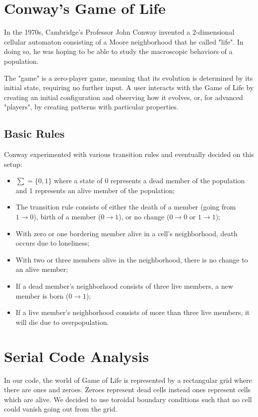 \documentclass[a4paper,11pt,twoside]{report}
\begin{document}
\chapter{Conway's Game of Life}\label{Conway}

In the 1970s, Cambridge's Professor John Conway invented a 2-dimensional cellular automaton consisting of a Moore neighborhood that he called "life". In doing so, he was hoping to be able to study the macroscopic behaviors of a population.

\noindent The "game" is a zero-player game, meaning that its evolution is determined by its initial state, requiring no further input. A user interacts with the Game of Life by creating an initial configuration and observing how it evolves, or, for advanced "players", by creating patterns with particular properties.

\section{Basic Rules}
Conway experimented with various transition rules and eventually decided on this setup:
\begin{itemize}
	\item $\sum = \{0, 1\}$ where a state of 0 represents a dead member of the population and 1 represents an alive member of the population;
	\item The transition rule consists of either the death of a member (going from $1 \rightarrow 0$), birth of a member ($0 \rightarrow 1$), or no change ($0 \rightarrow 0$ or $1 \rightarrow 1$);
	\item With zero or one bordering member alive in a cell's neighborhood, death occurs due to loneliness;
	\item With two or three members alive in the neighborhood, there is no change to an alive member;
	\item If a dead member's neighborhood consists of three live members, a new member is born ($0 \rightarrow 1$);
	\item If a live member's neighborhood consists of more than three live members, it will die due to overpopulation.
\end{itemize}


\chapter {Serial Code Analysis}

In our code, the world of Game of Life is represented by a rectangular grid where there are ones and zeroes. Zeroes represent dead cells instead ones represent cells which are alive. We decided to use toroidal boundary conditions such that no cell could vanish going out from the grid.
\end{document}
